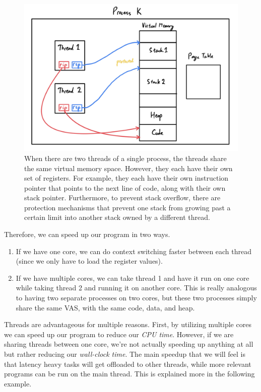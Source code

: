 \documentclass{article}
\begin{document}
\begin{definition}[Threads]
      \begin{figure}[H]
        \centering 
        \includegraphics[scale=0.35]{img/2_threads.png}
        \caption{When there are two threads of a single process, the threads share the same virtual memory space. However, they each have their own set of registers. For example, they each have their own instruction pointer that points to the next line of code, along with their own stack pointer. Furthermore, to prevent stack overflow, there are protection mechanisms that prevent one stack from growing past a certain limit into another stack owned by a different thread. } 
        \label{fig:2_threads}
      \end{figure}
      Therefore, we can speed up our program in two ways. 
      \begin{enumerate}
        \item If we have one core, we can do context switching faster between each thread (since we only have to load the register values). 
        \item If we have multiple cores, we can take thread 1 and have it run on one core while taking thread 2 and running it on another core. This is really analogous to having two separate processes on two cores, but these two processes simply share the same VAS, with the same code, data, and heap. 
      \end{enumerate}
    \end{definition}

    Threads are advantageous for multiple reasons. First, by utilizing multiple cores we can speed up our program to reduce our \textit{CPU time}. However, if we are sharing threads between one core, we're not actually speeding up anything at all but rather reducing our \textit{wall-clock time}. The main speedup that we will feel is that latency heavy tasks will get offloaded to other threads, while more relevant programs can be run on the main thread. This is explained more in the following example. 
\end{document}
